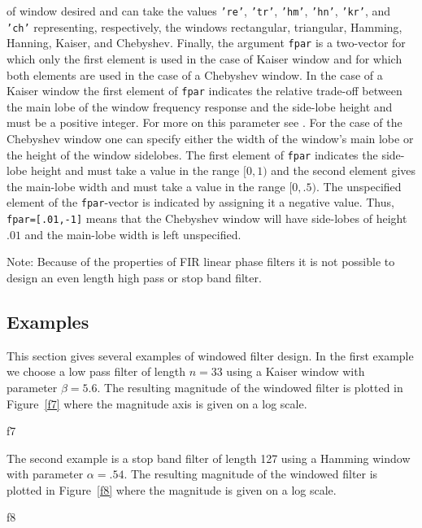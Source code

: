 of window desired and can take the values {\tt 're'}, {\tt 'tr'},
{\tt 'hm'}, {\tt 'hn'}, {\tt 'kr'}, and {\tt 'ch'} representing,
respectively, the windows rectangular, triangular, Hamming, Hanning,
Kaiser, and Chebyshev.  Finally, the argument {\tt fpar} is a two-vector
for which only the first element is used in the case of Kaiser window
and for which both elements are used in the case of a Chebyshev window.
In the case of a Kaiser window the first element of {\tt fpar} 
indicates the relative trade-off between the main lobe of the window
frequency response and the side-lobe height and must be a positive integer.
For more on this parameter see \cite{rabiner}.  For the case of the
Chebyshev window one can specify either the width of the window's main
lobe or the height of the window sidelobes.  The first element of
{\tt fpar} indicates the side-lobe height and must take a value
in the range $[0,1)$ and the second element 
gives the main-lobe width and must take a value in the range $[0,.5)$.
The unspecified element of the {\tt fpar}-vector is indicated by
assigning it a negative value.  Thus, {\tt fpar=[.01,-1]} means
that the Chebyshev window will have side-lobes of height $.01$ and
the main-lobe width is left unspecified.

	Note: Because of the properties of FIR linear phase filters it is
not possible to design an even length high pass or stop band filter.
 
\subsection{Examples}
\label{s5}

	This section gives several examples of windowed filter design.
In the first example we choose a low pass filter of length $n=33$
using a Kaiser window with parameter $\beta=5.6$.  The resulting magnitude
of the windowed filter is 
plotted in Figure~\ref{f7} where the magnitude axis is given on a log scale.
%

{f7}
%

	The second example is a stop band filter of length 127
using a Hamming window with parameter $\alpha=.54$.  The resulting
magnitude of the windowed filter is plotted in Figure~\ref{f8} where
the magnitude is given on a log scale.
%

{f8}
%

